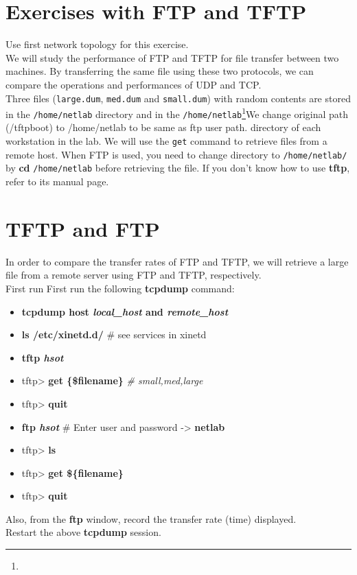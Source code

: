 \documentclass[10pt,a4paper]{article}
\numberwithin{equation}{section}
\numberwithin{figure}{section}
\numberwithin{table}{section}
\begin{document}
\section*{Exercises with FTP and TFTP}
	Use first network topology for this exercise.\\
	We will study the performance of FTP and TFTP for file transfer between two machines.
	By transferring the same file using these two protocols, we can compare the operations and performances of UDP and TCP. \\
	Three files (\texttt{large.dum}, \texttt{med.dum} and \texttt{small.dum}) with random contents are stored in the \texttt{/home/netlab} directory and in the \texttt{/home/netlab}\footnote{}{We change original path (/tftpboot) to /home/netlab to be same as ftp user path.} directory of each workstation in the lab.
	We will use the \texttt{get} command to retrieve files from a remote host.
	When FTP is used, you need to change directory to \texttt{/home/netlab/} by \textbf{cd} \texttt{/home/netlab} before retrieving the file.
	If you don’t know how to use \textbf{tftp}, refer to its manual page.


\section{TFTP and FTP}
	In order to compare the transfer rates of FTP and TFTP, we will retrieve a large file from a remote server using FTP and TFTP, respectively.\\
	First run First run the following \textbf{tcpdump} command:
	\begin{itemize}
		\item \textbf{tcpdump host \textit{local\_host} and \textit{remote\_host}}
	\end{itemize}
	\begin{itemize}		
		\item \textbf{ls /etc/xinetd.d/} \# see services in xinetd
		\item \textbf{tftp \textit{hsot}}
		\item tftp> \textbf{get \{\$filename\}} \textit{\# small,med,large}
		\item tftp> \textbf{quit}
		\item \textbf{ftp \textit{hsot}} \# Enter user and password -> \textbf{netlab}
		\item tftp> \textbf{ls}
		\item tftp> \textbf{get \$\{filename\}}
		\item tftp> \textbf{quit}
	\end{itemize}
	Also, from the \textbf{ftp} window, record the transfer rate (time) displayed. \\
	Restart the above \textbf{tcpdump} session.
\end{document}
